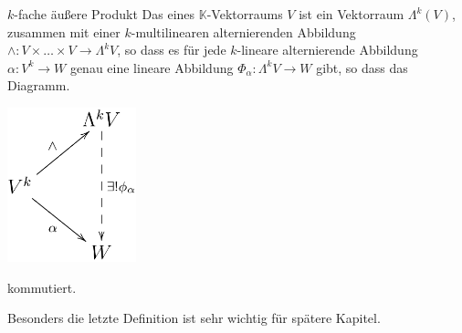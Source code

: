 \begin{Def}{$k$-fache äußere Produkt}
Das  eines $\mathbb{K}$-Vektorraums $V$ ist ein Vektorraum $\Lambda^k(V)$, zusammen mit einer $k$-multilinearen alternierenden Abbildung $\wedge: V\times \dots \times V \rightarrow \Lambda^kV$, so dass es für jede $k$-lineare alternierende Abbildung $\alpha: V^k\rightarrow W$ genau eine lineare Abbildung $\Phi_\alpha:\Lambda^kV\rightarrow W$ gibt, so dass das Diagramm.
\begin{center}
    \includegraphics[width=0.28\textwidth]{Dateien/Tensor4.png}
\end{center}
kommutiert.    
\end{Def}
Besonders die letzte Definition ist sehr wichtig für spätere Kapitel.
\newpage
